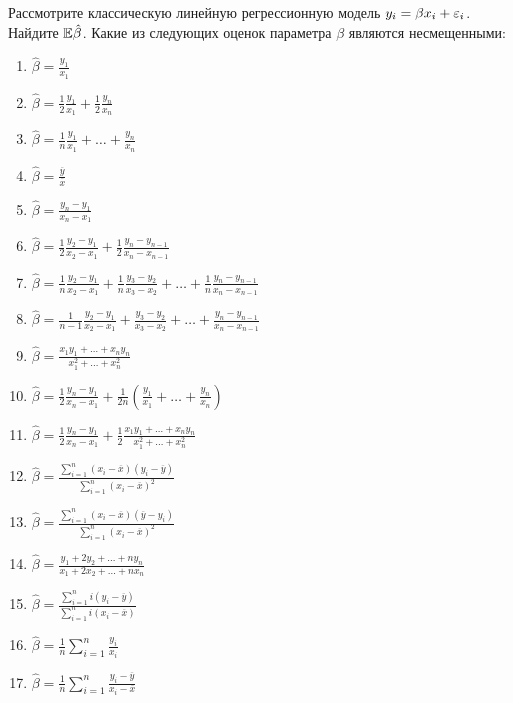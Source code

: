 \documentclass[pdftex,11pt,openany]{book}\usepackage[]{graphicx}\usepackage[]{color}
\begin{document}
\begin{problem}
 Рассмотрите классическую линейную регрессионную модель $y_i = \beta x_i + \varepsilon_i$. Найдите $\mathbb{E} \hat{\beta}$. Какие из следующих оценок параметра $\beta$ являются несмещенными:

\begin{enumerate}
\item $\hat{\beta} = \frac{y_1}{x_1}$
\item $\hat{\beta} = \frac{1}{2} \frac{y_1}{x_1} + \frac{1}{2} \frac{y_n}{x_n}$
\item $\hat{\beta} = \frac{1}{n}  \frac{y_1}{x_1} + \ldots + \frac{y_n}{x_n} $
\item $\hat{\beta} = \frac{\overline{y}}{\overline{x}}$
\item $\hat{\beta} = \frac{y_n - y_1}{x_n - x_1}$
\item $\hat{\beta} = \frac{1}{2} \frac{y_2 - y_1}{x_2 - x_1} + \frac{1}{2} \frac{y_n - y_{n-1}}{x_n - x_{n-1}}$
\item $\hat{\beta} = \frac{1}{n} \frac{y_2 - y_1}{x_2 - x_1} + \frac{1}{n} \frac{y_3 - y_2}{x_3 - x_2} + \ldots + \frac{1}{n} \frac{y_n - y_{n-1}}{x_n - x_{n-1}}$
\item $\hat{\beta} = \frac{1}{n-1}  \frac{y_2 - y_1}{x_2 - x_1} + \frac{y_3 - y_2}{x_3 - x_2} + \ldots + \frac{y_n - y_{n-1}}{x_n - x_{n-1}} $
\item $\hat{\beta} = \frac{x_1 y_1 + \ldots + x_n y_n}{x_1^2 + \ldots + x_n^2}$
\item $\hat{\beta} = \frac{1}{2} \frac{y_n - y_1}{x_n - x_1} + \frac{1}{2n}  \left( \frac{y_1}{x_1} + \ldots + \frac{y_n}{x_n} \right) $
\item $\hat{\beta} =  \frac{1}{2} \frac{y_n - y_1}{x_n - x_1} + \frac{1}{2} \frac{x_1 y_1 + \ldots + x_n y_n}{x_1^2 + \ldots + x_n^2}$
\item $\hat{\beta} = \frac{\sum_{i=1}^n (x_i - \overline{x})(y_i - \overline{y})}{\sum_{i=1}^n (x_i - \overline{x})^2}$
\item $\hat{\beta} = \frac{\sum_{i=1}^n (x_i - \overline{x})(\overline{y} - y_i)}{\sum_{i=1}^n (x_i - \overline{x})^2}$
\item $\hat{\beta} = \frac{y_1 + 2 y_2 + \ldots + n y_n}{x_1 + 2 x_2 + \ldots + n x_n}$
\item $\hat{\beta} = \frac{\sum_{i=1}^n i(y_i - \overline{y})}{\sum_{i=1}^n i(x_i - \overline{x})}$
\item $\hat{\beta} = \frac{1}{n} \sum_{i=1}^n \frac{y_i}{x_i}$
\item $\hat{\beta} = \frac{1}{n} \sum_{i=1}^n \frac{y_i - \overline{y}}{x_i - \overline{x}}$
\end{enumerate}
\end{problem}
\end{document}
